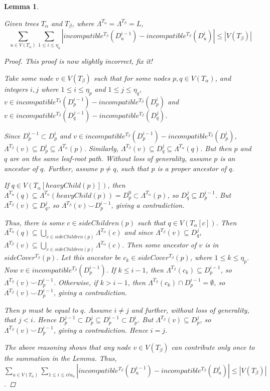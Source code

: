 \documentclass{article}
\newcommand{\compatible}{\smile}
\newcommand{\leafset}{\Lambda}
\newcommand{\TA}{T_\alpha}
\newcommand{\TB}{T_\beta}
\newtheorem{numremovednodes}[incompatibility]{Lemma}
\begin{document}
    \begin{numremovednodes}
        \label{lem:numremovednodes}

        Given trees $\TA$ and $\TB$, where $\leafset^{\TA} = \leafset^{\TB} = L$, \[\sum_{u \in V(\TA)} \sum_{1 \leq i \leq \eta_u} |incompatible^{\TB}(D_u^{i-1}) - incompatible^{\TB}(D_u^i)| \leq |V(\TB)|\]

        \begin{proof}
            {\color{red} This proof is now slightly incorrect, fix it!}

            Take some node $v \in V(\TB)$ such that for some nodes $p, q \in V(\TA)$, and integers $i, j$ where $1 \leq i \leq \eta_p$ and $1 \leq j \leq \eta_q$, $v \in incompatible^{\TB}(D_p^{i-1}) - incompatible^{\TB}(D_p^{i})$ and $v \in incompatible^{\TB}(D_q^{j-1}) - incompatible^{\TB}(D_q^{j})$.

            Since $D_p^{i-1} \subset D_p^i$ and $v \in incompatible^{\TB}(D_p^{i-1}) - incompatible^{\TB}(D_p^{i})$, $\leafset^{\TB}(v) \subseteq D_p^i \subseteq \leafset^{\TA}(p)$. Similarly, $\leafset^{\TB}(v) \subseteq D_q^j \subseteq \leafset^{\TA}(q)$. But then $p$ and $q$ are on the same leaf-root path. Without loss of generality, assume $p$ is an ancestor of $q$. Further, assume $p \neq q$, such that $p$ is a proper ancestor of $q$.

            If $q \in V(\TA[heavyChild(p)])$, then $\leafset^{\TA}(q) \subseteq \leafset^{\TA}(heavyChild(p)) = D_p^0 \subset \leafset^{\TA}(p)$, so $D_q^j \subseteq D_p^{i-1}$. But $\leafset^{\TB}(v) \subseteq D_q^j$, so $\leafset^{\TB}(v) \compatible D_p^{i-1}$, giving a contradiction.

            Thus, there is some $c \in sideChildren(p)$ such that $q \in V(\TA[c])$. Then $\leafset^{\TA}(q) \subseteq \bigcup_{c \in sideChildren(p)} \leafset^{\TA}(c)$ and since $\leafset^{\TB}(v) \subseteq D_q^j$, $\leafset^{\TB}(v) \subseteq \bigcup_{c \in sideChildren(p)} \leafset^{\TA}(c)$. Then some ancestor of $v$ is in $sideCover^{\TB}(p)$. Let this ancestor be $c_k \in sideCover^{\TB}(p)$, where $1 \leq k \leq \eta_{p}$. Now $v \in incompatible^{\TB}(D_p^{i-1})$. If $k \leq i - 1$, then $\leafset^{\TB}(c_k) \subseteq D_p^{i-1}$, so $\leafset^{\TB}(v) \compatible D_p^{i-1}$. Otherwise, if $k > i - 1$, then $\leafset^{\TB}(c_k) \cap D_p^{i-1} = \emptyset$, so $\leafset^{\TB}(v) \compatible D_p^{i-1}$, giving a contradiction.

            Then $p$ must be equal to $q$. Assume $i \neq j$ and further, without loss of generality, that $j < i$. Hence $D_p^{j-1} \subset D_p^{j} \subseteq D_p^{i-1} \subset D_p^{i}$. But $\leafset^{\TB}(v) \subseteq D_p^j$, so $\leafset^{\TB}(v) \compatible D_p^{i-1}$, giving a contradiction. Hence $i = j$.

            The above reasoning shows that any node $v \in V(\TB)$ can contribute only once to the summation in the Lemma. Thus, $\sum_{u \in V(\TA)} \sum_{1 \leq i \leq eta_u} |incompatible^{\TB}(D_u^{i-1}) - incompatible^{\TB}(D_u^i)| \leq |V(\TB)|$.
        \end{proof}
    \end{numremovednodes}
\end{document}
